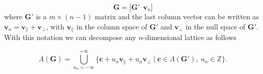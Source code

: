 \documentclass[english,12pt,a4paper,pdftex,sci,utf8]{aaltothesis}
\begin{document}
\begin{equation}
\mathbf{G} = \big[\mathbf{G}' \ \ \mathbf{v}_n \big]
\label{eq:gen}
\end{equation}
where $\mathbf{G}'$ is a $m \times (n-1)$ matrix and the last column vector can be written as $\mathbf{v}_n = \mathbf{v}_{\parallel} + \mathbf{v}_{\bot}$, with $\mathbf{v}_{\parallel}$ in the column space of $\mathbf{G}'$ and $\mathbf{v}_{\bot}$ in the null space of $\mathbf{G}'$. With this notation we can decompose any $n$-dimensional lattice as follows

\begin{equation}
\Lambda(\mathbf{G}) = \bigcup_{u_n=-\infty}^{+\infty} \big\{\mathbf{c}+u_n\mathbf{v}_{\parallel}+u_n\mathbf{v}_{\bot} \mid \mathbf{c} \in \Lambda(\mathbf{G}'), \ u_n \in \mathbb{Z} \big\}.
\label{eq:decom}
\end{equation}
\end{document}
